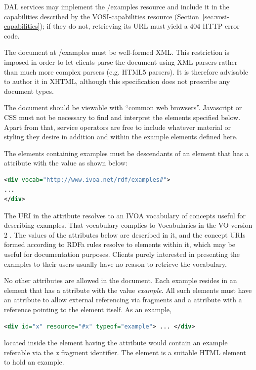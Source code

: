 \documentclass[11pt,letter]{ivoa}
\begin{document}
DAL services may implement the /examples resource and include it in the
capabilities described by the VOSI-capabilities resource 
(Section~\ref{sec:vosi-capabilities}); if they
do not, retrieving its URL must yield a 404 HTTP error code.

The document at /examples must be well-formed XML. This restriction is imposed
in order to let clients parse the document using XML parsers rather than
much more complex parsers (e.g. HTML5 parsers). It is therefore advisable to
author it in XHTML, although this specification does not prescribe any document
types.

The document should be viewable with ``common web browsers''. Javascript or CSS
must not be necessary to find and interpret the elements specified below.  Apart
from that, service operators are free to include whatever material or styling
they desire in addition and within the example elements defined here.

The elements containing examples must be descendants of an element that has a
 attribute with the value as shown below:

\begin{lstlisting}[language=XML]
<div vocab="http://www.ivoa.net/rdf/examples#">
...
</div>
\end{lstlisting}

The URI in the  attribute resolves to an IVOA vocabulary of
concepts useful for describing examples.  That vocabulary complies to
Vocabularies in the VO version 2 \citep{2021ivoa.spec.0525D}.   The
values of the  attributes below are described in it, and
the concept URIs formed according to RDFa rules resolve to elements
within it, which may be useful for documentation purposes.  Clients
purely interested in presenting the examples to their users usually have
no reason to retrieve the vocabulary.

No other  attributes are allowed in the document. Each example resides in
an element that has a  attribute with the value
\emph{example}. All such elements
must have an  attribute to allow external referencing via fragments and a
 attribute with a reference pointing to the element itself. As an
example,

\begin{lstlisting}[language=XML]
<div id="x" resource="#x" typeof="example"> ... </div>
\end{lstlisting}

\noindent located inside the element having the  attribute would
contain an example referable via the \emph{x} fragment identifier. The
 element is
a suitable HTML element to hold an example.
\end{document}
